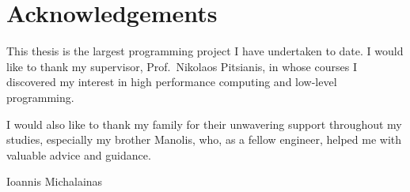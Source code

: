 \chapter*{Acknowledgements}
\label{ch:acknowledgements}

This thesis is the largest programming project I have undertaken to date. I
would like to thank my supervisor, Prof.~Nikolaos Pitsianis, in whose courses I
discovered my interest in high performance computing and low-level programming.

I would also like to thank my family for their unwavering support throughout my
studies, especially my brother Manolis, who, as a fellow engineer, helped me
with valuable advice and guidance.

\vspace{1cm}
\begin{flushright}
    Ioannis Michalainas
\end{flushright}
